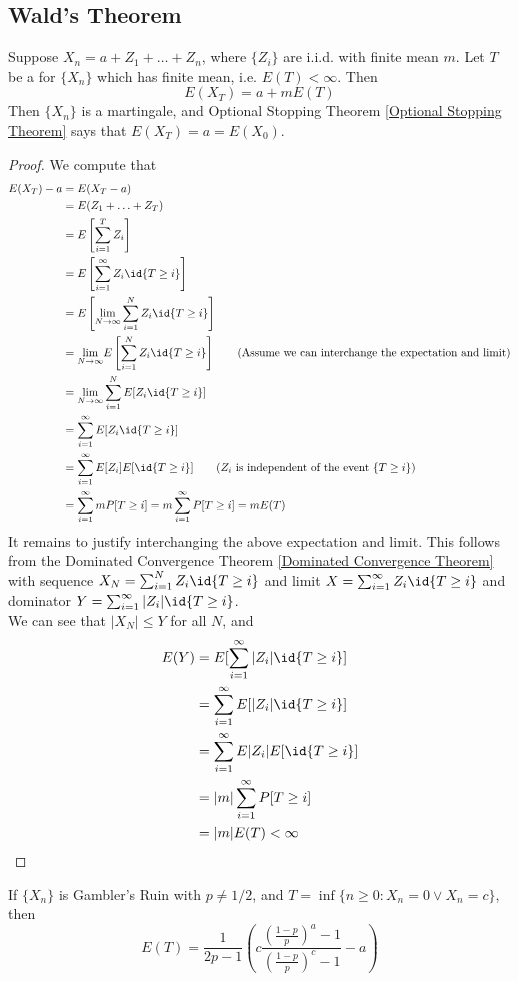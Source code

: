 \documentclass[11pt]{article}
\renewcommand{\limit}[1]{\underset{{#1} \rightarrow \infty}{\lim}}
\begin{document}
    \subsection{Wald's Theorem}
    Suppose $X_n = a + Z_1 + \hdots + Z_n$, where $\{Z_i\}$ are i.i.d. with finite mean $m$. Let $T$ be a  for $\{X_n\}$ which has finite mean, i.e. $E(T) < \infty$. Then
    $$E(X_T) = a + mE(T)$$
    \property[Special case: $m = 0$]
    Then $\{X_n\}$ is a martingale, and Optional Stopping Theorem \ref{Optional Stopping Theorem} says that $E(X_T) = a = E(X_0)$. \\
    \begin{proof}
    	We compute that
    	\begin{align*}
    		E(X_T) - a &= E(X_T - a) \\
    		&= E(Z_1 + \hdots + Z_T) \\
    		&= E\left[ \sum_{i=1}^T Z_i\right] \\
    		&= E\left[ \sum_{i=1}^\infty Z_i \id{T\geq i} \right]\\
    		&= E\left[ \limit{N}\sum_{i=1}^N Z_i \id{T\geq i} \right] \\
    		&= \limit{N}E\left[\sum_{i=1}^N Z_i \id{T\geq i} \right]\tag{Assume we can interchange the expectation and limit}\\
    		&= \limit{N}\sum_{i=1}^N E[Z_i\id{T\geq i}] \\
    		&= \sum_{i=1}^\infty E[Z_i \id{T\geq i}] \\
    		&= \sum_{i=1}^\infty E[Z_i] E[\id{T\geq i}] \tag{$Z_i$ is independent of the event $\{T\geq i\}$} \\
    		&= \sum_{i=1}^\infty m P[T \geq i] = m \sum_{i=1}^\infty P[T \geq i] = mE(T)
    	\end{align*}
    	It remains to justify interchanging the above expectation and limit. This follows from the Dominated Convergence Theorem \ref{Dominated Convergence Theorem} with sequence $X_N = \sum_{i=1}^N Z_i\id{T\geq i}$ and limit $X = \sum_{i=1}^\infty Z_i \id{T\geq i}$ and dominator $Y = \sum_{i=1}^\infty |Z_i|\id{T\geq i}$.\\
    	We can see that $|X_N| \leq Y$ for all $N$, and
    	\begin{align*}
    		E(Y) &= E[\sum_{i=1}^\infty |Z_i|\id{T\geq i}] \\
    		&= \sum_{i=1}^\infty E[|Z_i|\id{T\geq i}] \\
    		&= \sum_{i=1}^\infty E|Z_i|E[\id{T\geq i}] \\
    		&= |m| \sum_{i=1}^\infty P[T\geq i] \\
    		&= |m| E(T) < \infty
    	\end{align*}
    \end{proof}
    \corollary If $\{X_n\}$ is Gambler's Ruin with $p \neq 1/2$, and $T = \inf\{n \geq 0: X_n = 0 \lor X_n = c\}$, then
    $$E(T) = \frac{1}{2p-1}\left( c \frac{\left( \frac{1-p}{p}\right)^a - 1}{\left( \frac{1-p}{p}\right)^c - 1}-a\right)$$
    
\end{document}
